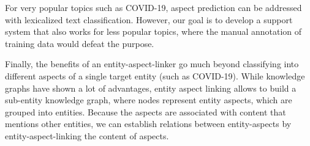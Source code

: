  For very popular topics such as COVID-19, aspect prediction can be addressed with lexicalized text classification. However, our goal is to develop a support system that also works for less popular topics, where the manual annotation of training data would defeat the purpose. 

Finally, the benefits of an entity-aspect-linker go much beyond classifying into different aspects of a single target entity (such as COVID-19). While knowledge graphs have shown a lot of advantages, entity aspect linking allows to build a sub-entity knowledge graph, where nodes represent entity aspects, which are grouped into entities. Because the aspects are associated with content that mentions other entities, we can establish relations between entity-aspects by entity-aspect-linking the content of aspects.





